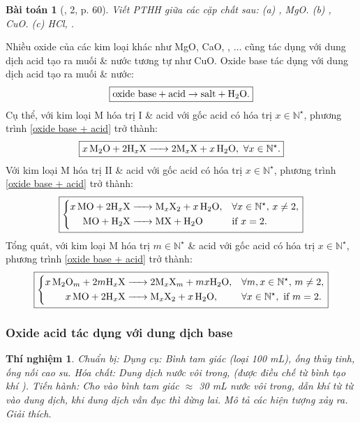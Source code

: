 \documentclass{article}
\newtheorem{baitoan}{Bài toán}
\newtheorem{thinghiem}{Thí nghiệm}
\begin{document}
\begin{baitoan}[\cite{SGK_KHTN_8_Canh_Dieu}, 2, p. 60]
	Viết PTHH giữa các cặp chất sau: (a) \emph{, MgO}. (b) \emph{, CuO}. (c) \emph{HCl, }.
\end{baitoan}
Nhiều oxide của các kim loại khác như MgO, CaO, , $\ldots$ cũng tác dụng với dung dịch acid tạo ra muối \& nước tương tự như CuO. Oxide base tác dụng với dung dịch acid tạo ra muối \& nước:
\begin{align}
	\label{oxide base + acid}
	\boxed{\mbox{oxide base} + \mbox{acid}\to\mbox{salt} + \ce{H2O}.}
\end{align}
Cụ thể, với kim loại M hóa trị I \& acid  với gốc acid  có hóa trị $x\in\mathbb{N}^\star$, phương trình \eqref{oxide base + acid} trở thành:
\begin{align}
	\boxed{\ce{$x$M2O + $2$H_xX -> $2$M_xX + $x$H2O},\ \forall x\in\mathbb{N}^\star.}
\end{align}
Với kim loại M hóa trị II \& acid  với gốc acid  có hóa trị $x\in\mathbb{N}^\star$, phương trình \eqref{oxide base + acid} trở thành:
\begin{equation}
	\boxed{\left\{\begin{split}
			\ce{$x$MO + $2$H_xX &-> M_xX2 + $x$H2O},&&\forall x\in\mathbb{N}^\star,\,x\ne2,\\
			\ce{MO + H2X &-> MX + H2O}&&\mbox{if } x = 2.
		\end{split}\right.}
\end{equation}
Tổng quát, với kim loại M hóa trị $m\in\mathbb{N}^\star$ \& acid  với gốc acid  có hóa trị $x\in\mathbb{N}^\star$, phương trình \eqref{oxide base + acid} trở thành:
\begin{equation}
	\boxed{\left\{\begin{split}
			\ce{$x$M2O_m + $2m$H_xX &-> $2$M_xX_m + $mx$H2O},&&\forall m,x\in\mathbb{N}^\star,\,m\ne2,\\
			\ce{$x$MO + $2$H_xX &-> M_xX2 + $x$H2O},&&\forall x\in\mathbb{N}^\star,\mbox{ if } m = 2.
		\end{split}\right.}
\end{equation}

\subsubsection{Oxide acid tác dụng với dung dịch base}

\begin{thinghiem}
	\emph{Chuẩn bị:} Dụng cụ: Bình tam giác (loại \emph{100 mL}), ống thủy tinh, ống nối cao su. Hóa chất: Dung dịch nước vôi trong, \emph{} (được điều chế từ bình tạo khí \emph{}). \emph{Tiến hành:} Cho vào bình tam giác $\approx$ \emph{30 mL} nước vôi trong, dẫn khí \emph{} từ từ vào dung dịch, khi dung dịch vẫn đục thì dừng lai. Mô tả các hiện tượng xảy ra. Giải thích.
\end{thinghiem}
\end{document}
